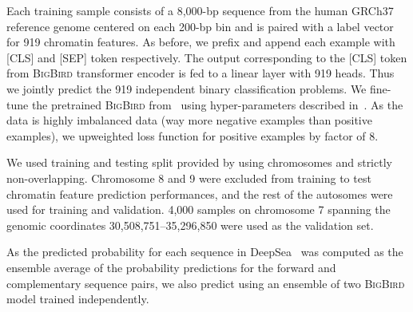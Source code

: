 \documentclass{article}
\newcommand{\bigb}{\textsc{BigBird}\xspace}
\begin{document}
Each training sample consists of a 8,000-bp sequence from the human GRCh37 reference genome centered on each 200-bp bin and is paired with a label vector for 919 chromatin features.
As before, we prefix and append each example with [CLS] and [SEP] token respectively.
The output corresponding to the [CLS] token from \bigb transformer encoder is fed to a linear layer with 919 heads. Thus we jointly predict the 919 independent binary classification problems.
We fine-tune the pretrained \bigb from~ using hyper-parameters described in~.
As the data is highly imbalanced data (way more negative examples than positive examples), we upweighted loss function for positive examples by factor of 8.

We used training and testing split provided by \citet{zhou2015predicting} using chromosomes and strictly non-overlapping. Chromosome 8 and 9 were excluded from training to test chromatin feature prediction performances, and the rest of the autosomes were used for training and validation. 4,000 samples on chromosome 7 spanning the genomic coordinates 30,508,751–35,296,850 were used as the validation set. 

As the predicted probability for each sequence in DeepSea~\citet{zhou2015predicting} was computed as the ensemble average of the probability predictions for the forward and complementary sequence pairs, we also predict using an ensemble of two \bigb model trained independently. \clearpage{}
\end{document}
